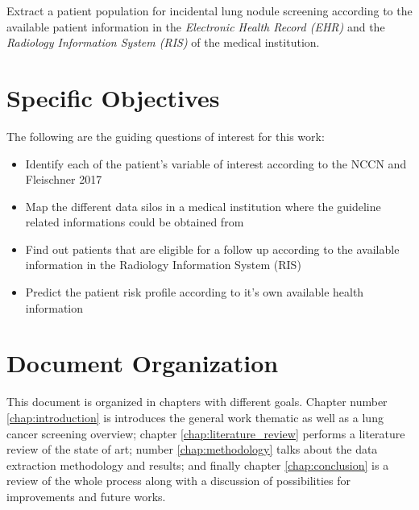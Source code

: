 Extract a patient population for incidental lung nodule screening according to the available patient information in the \emph{Electronic Health Record (EHR)} and the \emph{Radiology Information System (RIS)} of the medical institution. 

\section{Specific Objectives}

The following are the guiding questions of interest for this work:

\begin{itemize}
  \item Identify each of the patient's variable of interest according to the NCCN and Fleischner 2017
  \item Map the different data silos in a medical institution where the guideline related informations could be obtained from
  \item Find out patients that are eligible for a follow up according to the available information in the Radiology Information System (RIS)
  \item Predict the patient risk profile according to it's own available health information
\end{itemize}

\section{Document Organization}

This document is organized in chapters with different goals. Chapter number \ref{chap:introduction} is introduces the general work thematic as well as a lung cancer screening overview; chapter \ref{chap:literature_review} performs a literature review of the state of art; number \ref{chap:methodology} talks about the data extraction methodology and results; and finally chapter \ref{chap:conclusion} is a review of the whole process along with a discussion of possibilities for improvements and future works.

